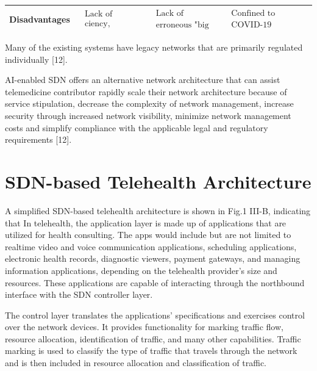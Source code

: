 \documentclass[10pt]{article}
\begin{document}
\begin{center}
\begin{tabular}{|l|l|l|l|}
\hline
Disadvantages & $\begin{array}{l}\text { Lack of resources reduces effi- } \\ \text { ciency, interfering people's privacy. }\end{array}$ & $\begin{array}{l}\text { Lack of historical training data and concerns with } \\ \text { erroneous "big data" harvested from social media }\end{array}$ & $\begin{array}{l}\text { Confined to hospitalizations related to } \\ \text { COVID-19 identified in the checking areas }\end{array}$ \\
\hline
\end{tabular}
\end{center}

Many of the existing systems have legacy networks that are primarily regulated individually [12].

AI-enabled SDN offers an alternative network architecture that can assist telemedicine contributor rapidly scale their network architecture because of service stipulation, decrease the complexity of network management, increase security through increased network visibility, minimize network management costs and simplify compliance with the applicable legal and regulatory requirements [12].

\section{SDN-based Telehealth Architecture}
A simplified SDN-based telehealth architecture is shown in Fig.1 III-B, indicating that In telehealth, the application layer is made up of applications that are utilized for health consulting. The apps would include but are not limited to realtime video and voice communication applications, scheduling applications, electronic health records, diagnostic viewers, payment gateways, and managing information applications, depending on the telehealth provider's size and resources. These applications are capable of interacting through the northbound interface with the SDN controller layer.

The control layer translates the applications' specifications and exercises control over the network devices. It provides functionality for marking traffic flow, resource allocation, identification of traffic, and many other capabilities. Traffic marking is used to classify the type of traffic that travels through the network and is then included in resource allocation and classification of traffic.
\end{document}
